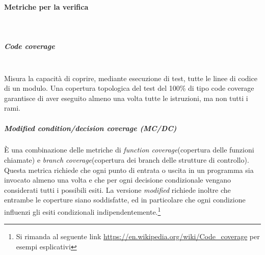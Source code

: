 \paragraph{Metriche per la verifica}\mbox{}\\
\subparagraph{Code coverage}\mbox{}\\
Misura la capacità di coprire, mediante esecuzione di test, tutte le linee di codice di un modulo. Una copertura topologica del test del 100\% di tipo code coverage garantisce di aver eseguito almeno una volta tutte le istruzioni, ma non tutti i rami.

\subparagraph{Modified condition/decision coverage (MC/DC)}
\`{E} una combinazione delle metriche di \textit{function coverage}(copertura delle funzioni chiamate) e \textit{branch coverage}(copertura dei branch delle strutture di controllo). Questa metrica richiede che ogni punto di entrata o uscita in un programma sia invocato almeno una volta e che per ogni decisione condizionale vengano considerati tutti i possibili esiti. La versione \textit{modified} richiede inoltre che entrambe le coperture siano soddisfatte, ed in particolare che ogni condizione influenzi gli esiti condizionali indipendentemente.\footnote{Si rimanda al seguente link \url{https://en.wikipedia.org/wiki/Code_coverage} per esempi esplicativi}
